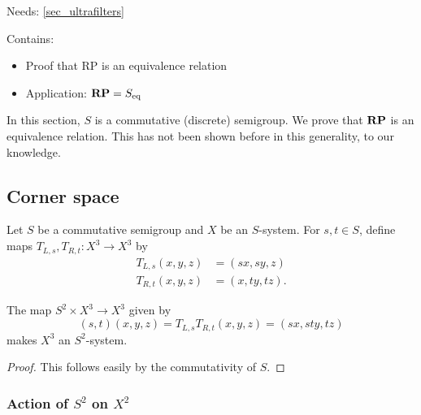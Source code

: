 Needs: \cref{sec_ultrafilters}

Contains:
\begin{itemize}
    \item Proof that RP is an equivalence relation
    \item Application: $\mathbf{RP} = S_\text{eq}$
\end{itemize}

In this section, $S$ is a commutative (discrete) semigroup.  We prove that $\mathbf{RP}$ is an equivalence relation.  This has not been shown before in this generality, to our knowledge.

\subsection{Corner space}
\label{sec_corner_space}


Let $S$ be a commutative semigroup and $X$ be an $S$-system.  For $s, t \in S$, define maps $T_{L,s}, T_{R,t}: X^3 \to X^3$ by
\begin{align*}
    T_{L,s}(x,y,z) &= (sx, sy, z)\\
    T_{R,t}(x,y,z) &= (x, ty, tz).
\end{align*}

\begin{lemma}[Action of $S^2$ on $X^3$]
\label{lemma_S2_action_on_X3}
\leanok{}
    The map $S^2 \times X^3 \to X^3$ given by
    \[(s,t)(x,y,z) = T_{L,s}T_{R,t}(x,y,z) = (sx,sty,tz)\]
    makes $X^3$ an $S^2$-system.
\end{lemma}

\begin{proof}
\leanok{}
    This follows easily by the commutativity of $S$.
\end{proof}


\subsubsection{Action of $S^2$ on $X^2$}

